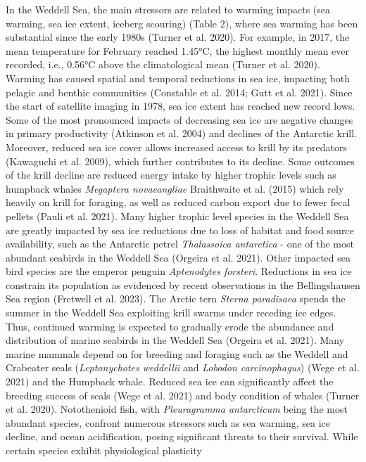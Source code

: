 \documentclass[
]{article}
\begin{document}
In the Weddell Sea, the main stressors are related to warming impacts
(sea warming, sea ice extent, iceberg scouring) (Table 2), where sea
warming has been substantial since the early 1980s (Turner et al. 2020).
For example, in 2017, the mean temperature for February reached 1.45°C,
the highest monthly mean ever recorded, i.e., 0.56°C above the
climatological mean (Turner et al. 2020). Warming has caused spatial and
temporal reductions in sea ice, impacting both pelagic and benthic
communities (Constable et al. 2014; Gutt et al. 2021). Since the start
of satellite imaging in 1978, sea ice extent has reached new record
lows. Some of the most pronounced impacts of decreasing sea ice are
negative changes in primary productivity (Atkinson et al. 2004) and
declines of the Antarctic krill. Moreover, reduced sea ice cover allows
increased access to krill by its predators (Kawaguchi et al. 2009),
which further contributes to its decline. Some outcomes of the krill
decline are reduced energy intake by higher trophic levels such as
humpback whales \emph{Megaptera novaeangliae} Braithwaite et al. (2015)
which rely heavily on krill for foraging, as well as reduced carbon
export due to fewer fecal pellets (Pauli et al. 2021). Many higher
trophic level species in the Weddell Sea are greatly impacted by sea ice
reductions due to loss of habitat and food source availability, such as
the Antarctic petrel \emph{Thalassoica antarctica} - one of the most
abundant seabirds in the Weddell Sea (Orgeira et al. 2021). Other
impacted sea bird species are the emperor penguin \emph{Aptenodytes
forsteri}. Reductions in sea ice constrain its population as evidenced
by recent observations in the Bellingshausen Sea region (Fretwell et al.
2023). The Arctic tern \emph{Sterna paradisaea} spends the summer in the
Weddell Sea exploiting krill swarms under receding ice edges. Thus,
continued warming is expected to gradually erode the abundance and
distribution of marine seabirds in the Weddell Sea (Orgeira et al.
2021). Many marine mammals depend on for breeding and foraging such as
the Weddell and Crabeater seals (\emph{Leptonychotes weddellii} and
\emph{Lobodon carcinophagus}) (Wege et al. 2021) and the Humpback whale.
Reduced sea ice can significantly affect the breeding success of seals
(Wege et al. 2021) and body condition of whales (Turner et al. 2020).
Notothenioid fish, with \emph{Pleuragramma antarcticum} being the most
abundant species, confront numerous stressors such as sea warming, sea
ice decline, and ocean acidification, posing significant threats to
their survival. While certain species exhibit physiological plasticity
\end{document}

